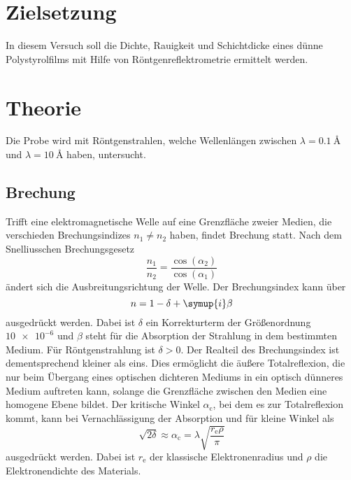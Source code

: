 \section{Zielsetzung}

    \noindent In diesem Versuch soll die Dichte, Rauigkeit und Schichtdicke eines dünne Polystyrolfilms mit Hilfe von Röntgenreflektrometrie 
    ermittelt werden. 

\section{Theorie}

    \noindent
    Die Probe wird mit Röntgenstrahlen, welche Wellenlängen zwischen $\lambda = \SI{0.1}{\angstrom}$ und $\lambda = \SI{10}{\angstrom}$ haben, 
    untersucht. 

    \subsection{Brechung}

        \noindent
        Trifft eine elektromagnetische Welle auf eine Grenzfläche zweier Medien, die verschieden Brechungsindizes $n_1 \neq n_2$ haben, findet Brechung
        statt. Nach dem Snelliusschen Brechungsgesetz 
        \begin{equation*}
            \frac{n_1}{n_2} = \frac{\cos(\alpha_2)}{\cos(\alpha_1)}
        \end{equation*}
        ändert sich die Ausbreitungsrichtung der Welle. 
        Der Brechungsindex kann über 
        \begin{equation*}
            n = 1 - \delta + \symup{i} \beta 
        \end{equation*}
        ausgedrückt werden. Dabei ist $\delta$ ein Korrekturterm der Größenordnung $\num{10e-6}$ und $\beta$ steht für die Absorption der Strahlung in dem 
        bestimmten Medium. 
        Für Röntgenstrahlung ist $\delta > 0$. Der Realteil des Brechungsindex ist dementsprechend kleiner als eins. 
        Dies ermöglicht die äußere Totalreflexion, die nur beim Übergang eines optischen dichteren Mediums in ein optisch dünneres Medium auftreten kann, 
        solange die Grenzfläche zwischen den Medien eine homogene Ebene bildet. 
        Der kritische Winkel $\alpha_\text{c}$, bei dem es zur Totalreflexion kommt, kann bei Vernachlässigung der Absorption und für kleine Winkel als 
        \begin{equation}
            \sqrt{2 \delta} \approx \alpha_\text{c} = \lambda \sqrt{\frac{r_\text{e} \rho}{\pi}} \label{eqn:crit}
        \end{equation}
        ausgedrückt werden. Dabei ist $r_\text{e}$ der klassische Elektronenradius und $\rho$ die Elektronendichte des Materials. 

